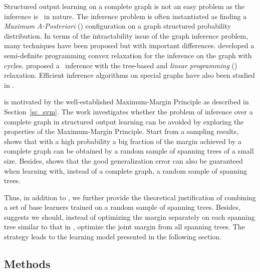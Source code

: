 {Structured output learning on a complete graph is not an easy problem as the inference is \nphard\ in nature.
The inference problem is often instantiated as finding a \textit{Maximum A-Posteriori} (\map) configuration on a graph structured probability distribution.
In terms of the intractability issue of the graph inference problem, many techniques have been proposed but with important differences.
\citet{Jordan04semiefinite} developed a semi-definite programming convex relaxation for the inference on the graph with cycles.
\citet{Wainwright05map} proposed a \map\ inference with the tree-based and \textit{linear programming} (\lp) relaxation.
Efficient inference algorithms on special graphs have also been studied in \citep{Globerson07approximate}.

 is motivated by the well-established Maximum-Margin Principle as described in Section~\ref{sc_svm}.
The work investigates whether the problem of inference over a complete graph in structured output learning can be avoided by exploring the properties of the Maximum-Margin Principle.
Start from a sampling results,  shows that with a high probability a big fraction of the margin achieved by a complete graph can be obtained by a random sample of spanning trees of a small size.
Besides,  shows that the good generalization error can also be guaranteed when learning with, instead of a complete graph, a random sample of spanning trees.

Thus, in addition to , we further provide the theoretical justification of combining a set of base learners trained on a random sample of spanning trees. 
Besides,  suggests we should, instead of optimizing the margin separately on each spanning tree similar to that in \mam, optimize the joint margin from all spanning trees.
The strategy leads to the learning model presented in the following section.

\subsection{Methods}

}
